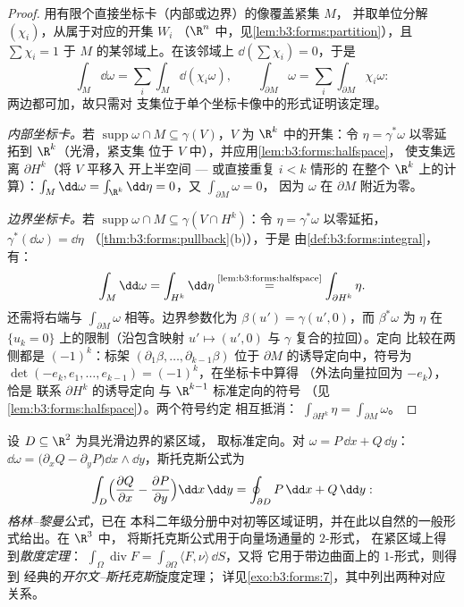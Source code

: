 \begin{proof}
用有限个直接坐标卡（内部或边界）的像覆盖紧集 $M$，
并取单位分解
$(\chi_i)$，从属于对应的开集 $W_i$
（$\R^n$ 中，见\cref{lem:b3:forms:partition}），且 $\sum\chi_i
= 1$ 于 $M$ 的某邻域上。在该邻域上
$\dd(\sum\chi_i) = 0$，于是
\[
\int_M\dd\omega = \sum_i\int_M\dd(\chi_i\omega),
\qquad
\int_{\partial M}\omega =
\sum_i\int_{\partial M}\chi_i\omega :
\]
两边都可加，故只需对
支集位于单个坐标卡像中的形式证明该定理。

\emph{内部坐标卡。}若 $\operatorname{supp}\omega \cap M
\subseteq \gamma(V)$，$V$ 为 $\R^k$ 中的开集：令 $\eta =
\gamma^*\omega$ 以零延拓到 $\R^k$（光滑，紧支集
位于 $V$ 中），并应用\cref{lem:b3:forms:halfspace}，
使支集远离 $\partial H^k$（将 $V$ 平移入
开上半空间 --- 或直接重复 $i < k$ 情形的
在整个 $\R^k$ 上的计算）：$\int_M\dd\omega =
\int_{\R^k}\dd\eta = 0$，又 $\int_{\partial M}\omega = 0$，
因为 $\omega$ 在 $\partial M$ 附近为零。

\emph{边界坐标卡。}若 $\operatorname{supp}\omega\cap M
\subseteq \gamma(V \cap H^k)$：令 $\eta = \gamma^*\omega$
以零延拓，
$\gamma^*(\dd\omega) = \dd\eta$
（\cref{thm:b3:forms:pullback}(b)），于是
由\cref{def:b3:forms:integral}，有：
\[
\int_M\dd\omega = \int_{H^k}\dd\eta
\overset{\text{\cref{lem:b3:forms:halfspace}}}{=}
\int_{\partial H^k}\eta .
\]
还需将右端与 $\int_{\partial
M}\omega$ 相等。边界参数化为 $\beta(u') =
\gamma(u', 0)$，而 $\beta^*\omega$ 为
$\eta$ 在 $\{u_k = 0\}$ 上的限制（沿包含映射 $u'
\mapsto (u', 0)$ 与 $\gamma$ 复合的拉回）。定向
比较在两侧都是 $(-1)^k$：标架
$(\partial_1\beta, \dots, \partial_{k-1}\beta)$ 位于
$\partial M$ 的诱导定向中，符号为
$\det(-e_k, e_1, \dots, e_{k-1}) = (-1)^k$，在坐标卡中算得
（外法向量拉回为 $-e_k$），恰是
联系 $\partial H^k$ 的诱导定向
与 $\R^{k-1}$ 标准定向的符号
（见\cref{lem:b3:forms:halfspace}）。两个符号约定
相互抵消：
$\int_{\partial H^k}\eta = \int_{\partial M}\omega$。
\end{proof}

\begin{example}[经典定理]
\label{ex:b3:forms:classical}
设 $D \subseteq \R^2$ 为具光滑边界的紧区域，
取标准定向。对 $\omega = P\,\dd x +
Q\,\dd y$：$\dd\omega = \bigl(\partial_xQ -
\partial_yP\bigr)\dd x\wedge\dd y$，斯托克斯公式为
\[
\int_D\Bigl(\frac{\partial Q}{\partial x} -
\frac{\partial P}{\partial y}\Bigr)\dd x\,\dd y
= \oint_{\partial D}P\,\dd x + Q\,\dd y :
\]
\emph{格林--黎曼公式}，已在
本科二年级分册中对初等区域证明，并在此以自然的一般形式给出。在 $\R^3$ 中，
将斯托克斯公式用于向量场通量的 $2$-形式，
在紧区域上得到\emph{散度定理}：
$\int_\Omega\operatorname{div}F =
\int_{\partial\Omega}\langle F, \nu\rangle\,\dd S$，又将
它用于带边曲面上的 $1$-形式，则得到
经典的\emph{开尔文--斯托克斯}旋度定理；
详见\cref{exo:b3:forms:7}，其中列出两种对应关系。
\end{example}

